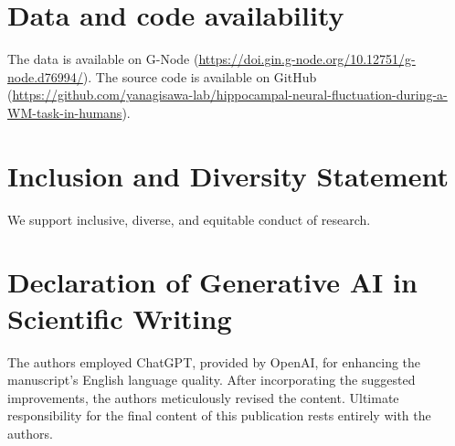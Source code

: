 \documentclass[final,3p,times,twocolumn]{elsarticle}
\begin{document}
\section*{Data and code availability}
The data is available on G-Node (\url{https://doi.gin.g-node.org/10.12751/g-node.d76994/}). The source code is available on GitHub (\url{https://github.com/yanagisawa-lab/hippocampal-neural-fluctuation-during-a-WM-task-in-humans}).
\label{data and code availability}

\section*{Inclusion and Diversity Statement}
We support inclusive, diverse, and equitable conduct of research.
\label{inclusion and diversity statement}

\section*{Declaration of Generative AI in Scientific Writing}
The authors employed ChatGPT, provided by OpenAI, for enhancing the manuscript's English language quality. After incorporating the suggested improvements, the authors meticulously revised the content. Ultimate responsibility for the final content of this publication rests entirely with the authors.
\label{declaration of generative ai in scientific writing}


\clearpage
\end{document}

